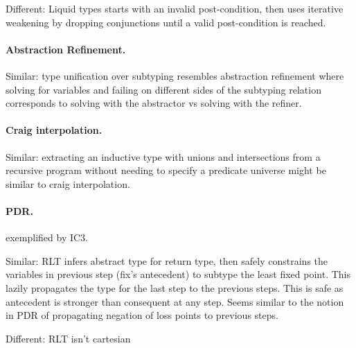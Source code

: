 \documentclass[acmsmall]{acmart}
\begin{document}
Different: Liquid types starts with an invalid post-condition, then uses iterative weakening by dropping conjunctions until a valid post-condition is reached.


\paragraph{Abstraction Refinement.} 
Similar: type unification over subtyping resembles abstraction refinement  
where solving for variables and failing on different sides of the subtyping relation corresponds to
solving with the abstractor vs solving with the refiner.

\paragraph{Craig interpolation.} 
Similar: extracting an inductive type with unions and intersections 
from a recursive program without needing to specify a predicate universe might be similar to
craig interpolation.

\paragraph{PDR.}
exemplified by IC3. 

Similar: RLT infers abstract type for return type, 
then safely constrains the variables in previous step (fix's antecedent) 
to subtype the least fixed point.
This lazily propagates the type for the last step to the previous steps.
This is safe as antecedent is stronger than consequent at any step.
Seems similar to the notion in PDR of propagating negation of loss points to previous steps. 

Different: RLT isn't cartesian
\end{document}
